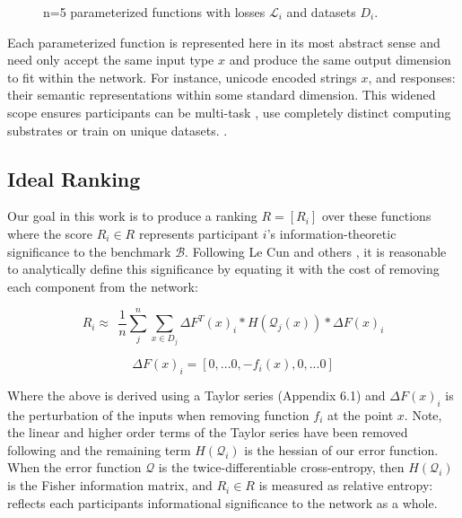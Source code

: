 \documentclass{article}
\begin{document}
\begin{figure}[H]
    \centering
    \hspace*{-2cm}
    
    \caption{n=5 parameterized functions with losses $\mathcal{L}_i$ and datasets $D_i$.}
\end{figure}{}

Each parameterized function is represented here in its most abstract sense\cite{hinton2015distilling} and need only accept the same input type $x$ and produce the same output dimension to fit within the network. For instance, unicode encoded strings $x$, and responses: their semantic representations within some standard dimension. This widened scope ensures participants can be multi-task \cite{kaiser2017model}, use completely distinct computing substrates \cite{alex2014cortical} or train on unique datasets. \cite{lample2019crosslingual}. 

\subsection{Ideal Ranking}

Our goal in this work is to produce a ranking $R = [R_i]$ over these functions where the score $R_i \in R$ represents participant $i$'s information-theoretic significance to the benchmark $\mathcal{B}$. Following Le Cun and others \cite{lecun1989optimalbraindamage,yu2017nisp}, it is reasonable to analytically define this significance by equating it with the cost of removing each component from the network:
\bigskip

\begin{equation}
R_i \approx \ \ \frac{1}{n} \sum_{j}^{n} \sum_{x \in D_j} \Delta F^T(x)_i * H(\mathcal{Q}_j(x)) * \Delta F(x)_i 
\end{equation}

\[ \Delta F (x)_i = [0, ... 0, -f_i(x), 0, ... 0] \]

Where the above is derived using a Taylor series (Appendix 6.1) and $\Delta F (x)_i$ is the perturbation of the inputs when removing function $f_i$ at the point $x$. Note, the linear and higher order terms of the Taylor series have been removed following \cite{yu2017nisp} and the remaining term $H(\mathcal{Q}_i)$ is the hessian of our error function. When the error function $\mathcal{Q}$ is the twice-differentiable cross-entropy, then $H(\mathcal{Q}_i)$ is the Fisher information matrix, and $R_i \in R$ is measured as relative entropy: reflects each participants informational significance to the network as a whole.
\bigskip
\end{document}
